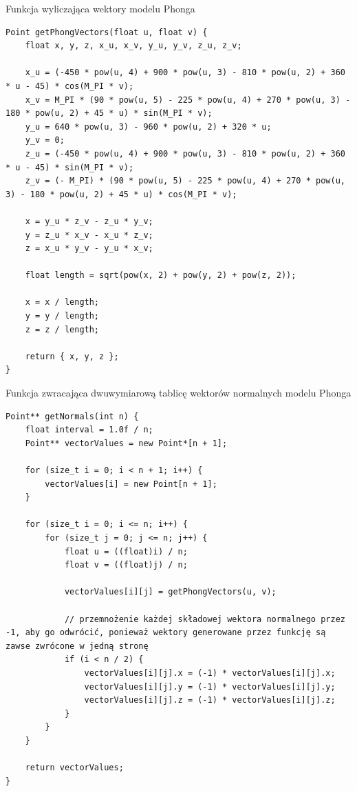 \documentclass[12pt,a4paper,titlepage]{article}
\begin{document}
\begin{listing}[H]
\caption{Funkcja wyliczająca wektory modelu Phonga}
\begin{verbatim}
Point getPhongVectors(float u, float v) {
    float x, y, z, x_u, x_v, y_u, y_v, z_u, z_v;

    x_u = (-450 * pow(u, 4) + 900 * pow(u, 3) - 810 * pow(u, 2) + 360 * u - 45) * cos(M_PI * v);
    x_v = M_PI * (90 * pow(u, 5) - 225 * pow(u, 4) + 270 * pow(u, 3) - 180 * pow(u, 2) + 45 * u) * sin(M_PI * v);
    y_u = 640 * pow(u, 3) - 960 * pow(u, 2) + 320 * u;
    y_v = 0;
    z_u = (-450 * pow(u, 4) + 900 * pow(u, 3) - 810 * pow(u, 2) + 360 * u - 45) * sin(M_PI * v);
    z_v = (- M_PI) * (90 * pow(u, 5) - 225 * pow(u, 4) + 270 * pow(u, 3) - 180 * pow(u, 2) + 45 * u) * cos(M_PI * v);

    x = y_u * z_v - z_u * y_v;
    y = z_u * x_v - x_u * z_v;
    z = x_u * y_v - y_u * x_v;

    float length = sqrt(pow(x, 2) + pow(y, 2) + pow(z, 2));

    x = x / length;
    y = y / length;
    z = z / length;

    return { x, y, z };
}
\end{verbatim}
\end{listing}

\begin{listing}[H]
\caption{Funkcja zwracająca dwuwymiarową tablicę wektorów normalnych modelu Phonga}
\begin{verbatim}
Point** getNormals(int n) {
    float interval = 1.0f / n;
    Point** vectorValues = new Point*[n + 1];

    for (size_t i = 0; i < n + 1; i++) {
        vectorValues[i] = new Point[n + 1];
    }

    for (size_t i = 0; i <= n; i++) {
        for (size_t j = 0; j <= n; j++) {
            float u = ((float)i) / n;
            float v = ((float)j) / n;

            vectorValues[i][j] = getPhongVectors(u, v);

            // przemnożenie każdej składowej wektora normalnego przez -1, aby go odwrócić, ponieważ wektory generowane przez funkcję są zawse zwrócone w jedną stronę
            if (i < n / 2) {
                vectorValues[i][j].x = (-1) * vectorValues[i][j].x;
                vectorValues[i][j].y = (-1) * vectorValues[i][j].y;
                vectorValues[i][j].z = (-1) * vectorValues[i][j].z;
            }
        }
    }

    return vectorValues;
}
\end{verbatim}
\end{listing}
\end{document}
